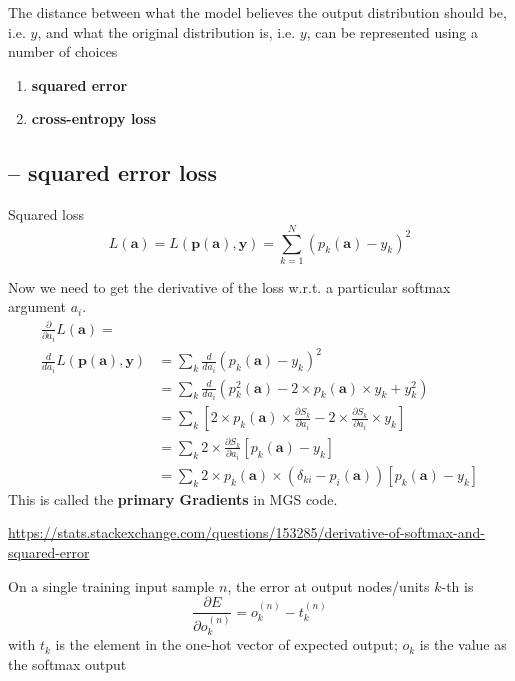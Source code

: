 The distance between what the model believes the output distribution should be,
i.e. $\hat{y}$, and what the original distribution is, i.e. $y$, can be represented using a number of choices

\begin{enumerate}
  \item {\bf squared error}
  
  
  \item {\bf cross-entropy loss}
\end{enumerate}

\subsection{-- squared error loss}
\label{sec:loss-squared-error-softmax}
 
Squared loss
\begin{equation}
L(\mathbf{a}) = L(\mathbf{p(a), y}) = \sum_{k=1}^N \left( p_k(\mathbf{a}) - y_k \right)^2
\end{equation}

Now we need to get the derivative of the loss w.r.t. a particular softmax argument $a_i$. 
\begin{equation}
\begin{split}
\frac{\partial}{\partial a_i}L(\mathbf{a}) = \\
\frac{d}{da_i}L(\mathbf{p(a), y})  &= 
   \sum_k \frac{d}{da_i}\left( p_k(\mathbf{a}) - y_k \right)^2 \\
   &= \sum_k \frac{d}{da_i}\left( p^2_k(\mathbf{a}) - 2 \times p_k(\mathbf{a}) \times y_k + y^2_k \right) \\
   &= \sum_k \left[ 2 \times p_k(\mathbf{a}) \times \frac{\partial S_k}{\partial a_i} - 2 \times \frac{\partial S_k}{\partial a_i} \times y_k  \right] \\
   &= \sum_k 2 \times \frac{\partial S_k}{\partial a_i} \left[ p_k(\mathbf{a})  - y_k  \right] \\
   &= \sum_k 2 \times p_k(\mathbf{a}) \times (\delta_{ki} - p_i(\mathbf{a})) \left[ p_k(\mathbf{a})  - y_k  \right] 
\end{split}
\end{equation}
This is called the {\bf primary Gradients} in MGS code.

\url{https://stats.stackexchange.com/questions/153285/derivative-of-softmax-and-squared-error}


On a single training input sample $n$, the error at output nodes/units $k$-th is
\begin{equation}
\frac{\partial E}{\partial o_k^{(n)}} = o_k^{(n)} - t_k^{(n)}
\end{equation}
with $t_k$ is the element in the one-hot vector of expected output; 
$o_k$ is the value as the softmax output


